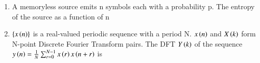 \documentclass[a4paper, 11pt]{article}
\begin{document}
\begin{enumerate}
    \hfill{}
    
    \item A memoryless source emits n symbols each with a probability p. The entropy of the source as a function of n
    \begin{enumerate}
    \end{enumerate}

    \hfill{}

    \item $\{x\left(n\right)\}$ is a real-valued periodic sequence with a period N. $x\left(n\right)$ and $X\left(k\right)$ form N-point Discrete Fourier Transform  pairs. The DFT $Y\left(k\right)$ of the sequence\\ $y\left(n\right) = \frac{1}{N}\sum_{r=0}^{N-1}x\left(r\right)x\left(n+r\right)$ is
    \begin{enumerate}
    \end{enumerate}
    
    \hfill{}
    

\end{enumerate}
\end{document}
